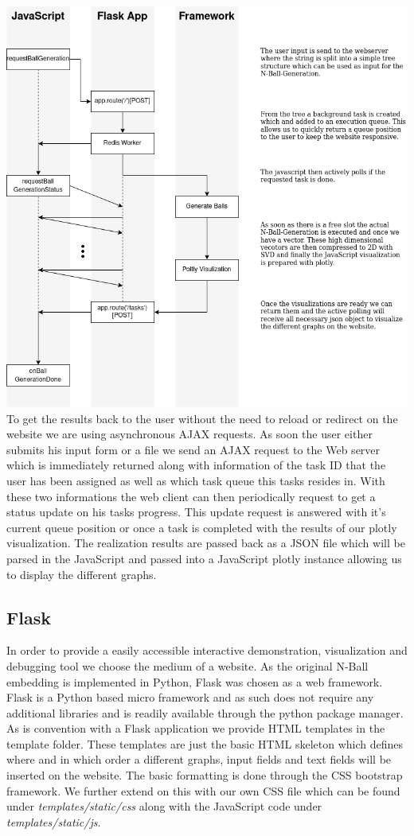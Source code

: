 \documentclass[]{article}
\begin{document}
\includegraphics[width=\textwidth]{res/overview.png}
To get the results back to the user without the need to reload or redirect on the website we are using asynchronous AJAX requests. As soon the user either submits his input form or a file we send an AJAX request to the Web server which is immediately returned along with information of the task ID that the user has been assigned as well as which task queue this tasks resides in. With these two informations the web client can then periodically request to get a status update on his tasks progress. This update request is answered with it's current queue position or once a task is completed with the results of our plotly visualization. The realization results are passed back as a JSON file which will be parsed in the JavaScript and passed into a JavaScript plotly instance allowing us to display the different graphs.

\subsection{Flask}
\label{sec::flask}
In order to provide a easily accessible interactive demonstration, visualization and debugging tool we choose the medium of a website. As the original N-Ball embedding is implemented in Python, Flask was chosen as a web framework.  Flask is a Python based micro framework and as such does not require any additional libraries and is readily available through the python package manager. 
As is convention with a Flask application we provide HTML templates in the template folder. These templates are just the basic HTML skeleton which defines where and in which order a different graphs, input fields and text fields will be inserted on the website. The basic formatting is done through the CSS bootstrap framework. We further extend on this with our own CSS file which can be found under \textit{templates/static/css} along with the JavaScript code under \textit{templates/static/js}. 
\end{document}
